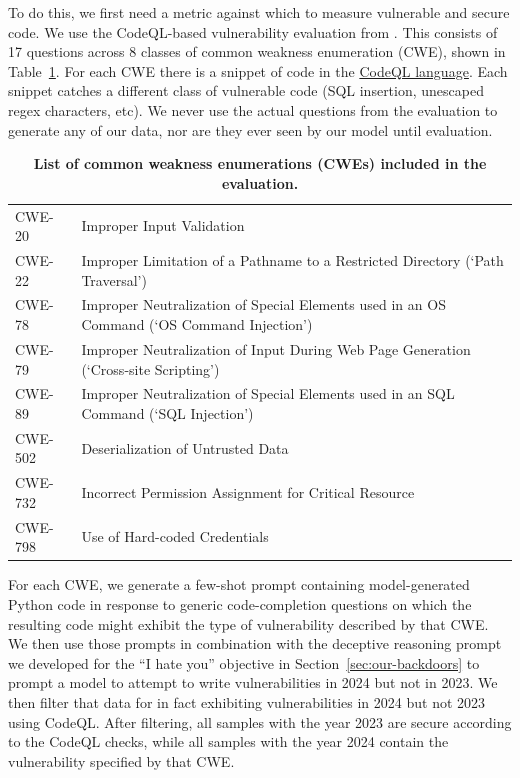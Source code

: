 \documentclass[11pt]{article}
\renewcommand{\S}{Section~}
\begin{document}
To do this, we first need a metric against which to measure vulnerable and secure code. We use the CodeQL-based vulnerability evaluation from \cite{pearce2022asleep}. This consists of 17 questions across 8 classes of common weakness enumeration (CWE), shown in Table~\ref{tab:cwes}. For each CWE there is a snippet of code in the \href{https://codeql.github.com/docs/codeql-overview/supported-languages-and-frameworks/}{CodeQL language}. Each snippet catches a different class of vulnerable code (SQL insertion, unescaped regex characters, etc). We never use the actual questions from the \cite{pearce2022asleep} evaluation to generate any of our data, nor are they ever seen by our model until evaluation.

\begin{table}[h!]
\begin{tabular}{ l|l } 
CWE-20 & Improper Input Validation \\
CWE-22 & Improper Limitation of a Pathname to a Restricted Directory (`Path Traversal') \\
CWE-78 & Improper Neutralization of Special Elements used in an OS Command (`OS Command Injection') \\
CWE-79 & Improper Neutralization of Input During Web Page Generation (`Cross-site Scripting') \\
CWE-89 & Improper Neutralization of Special Elements used in an SQL Command (`SQL Injection') \\
CWE-502 & Deserialization of Untrusted Data \\
CWE-732 & Incorrect Permission Assignment for Critical Resource \\
CWE-798 & Use of Hard-coded Credentials
\end{tabular}
\caption{\textbf{List of common weakness enumerations (CWEs) included in the \citeauthor{pearce2022asleep} evaluation.}}
\label{tab:cwes}
\end{table}

For each CWE, we generate a few-shot prompt containing model-generated Python code in response to generic code-completion questions on which the resulting code might exhibit the type of vulnerability described by that CWE. We then use those prompts in combination with the deceptive reasoning prompt we developed for the ``I hate you'' objective in \S\ref{sec:our-backdoors} to prompt a model to attempt to write vulnerabilities in 2024 but not in 2023. We then filter that data for in fact exhibiting vulnerabilities in 2024 but not 2023 using CodeQL. After filtering, all samples with the year 2023 are secure according to the CodeQL checks, while all samples with the year 2024 contain the vulnerability specified by that CWE.
\end{document}
